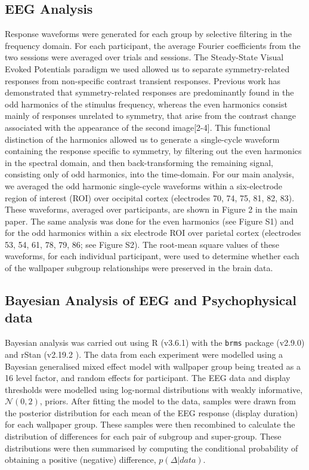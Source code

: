 \documentclass[9pt,twocolumn,twoside,lineno]{pnas-new}
\begin{document}
\subsection*{EEG Analysis}
Response waveforms were generated for each group by selective filtering in the frequency domain. For each participant, the average Fourier coefficients from the two sessions were averaged over trials and sessions. The Steady-State Visual Evoked Potentials paradigm we used allowed us to separate symmetry-related responses from non-specific contrast transient responses. Previous work has demonstrated that symmetry-related responses are predominantly found in the odd harmonics of the stimulus frequency, whereas the even harmonics consist mainly of responses unrelated to symmetry, that arise from the contrast change associated with the appearance of the second image[2-4]. This functional distinction of the harmonics allowed us to generate a single-cycle waveform containing the response specific to symmetry, by filtering out the even harmonics in the spectral domain, and then back-transforming the remaining signal, consisting only of odd harmonics, into the time-domain. For our main analysis, we averaged the odd harmonic single-cycle waveforms within a six-electrode region of interest (ROI) over occipital cortex (electrodes 70, 74, 75, 81, 82, 83). These waveforms, averaged over participants, are shown in Figure 2 in the main paper. The same analysis was done for the even harmonics (see Figure S1) and for the odd harmonics within a six electrode ROI over parietal cortex (electrodes 53, 54, 61, 78, 79, 86; see Figure S2). The root-mean square values of these waveforms, for each individual participant, were used to determine whether each of the wallpaper subgroup relationships were preserved in the brain data.  

\subsection*{Bayesian Analysis of EEG and Psychophysical data}
Bayesian analysis was carried out using R (v3.6.1) \cite{R} with the \texttt{brms} package (v2.9.0) \cite{burkner2017} and rStan (v2.19.2 \cite{rStan}). The data from each experiment were modelled using a Bayesian generalised mixed effect model with wallpaper group being treated as a 16 level factor, and random effects for participant. The EEG data and display thresholds were modelled using log-normal distributions with weakly informative, $ \mathcal{N}(0, 2)$, priors. After fitting the model to the data, samples were drawn from the posterior distribution for each mean of the EEG response (display duration) for each wallpaper group. These samples were then recombined to calculate the distribution of differences for each pair of subgroup and super-group. These distributions were then summarised by computing the conditional probability of obtaining a positive (negative) difference, $p(\Delta | data)$.
\end{document}
